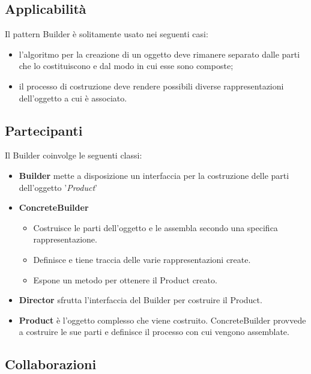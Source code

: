 \subsection{Applicabilità}

Il pattern Builder è solitamente usato nei seguenti casi:
\begin{itemize}
\item l'algoritmo per la creazione di un oggetto deve rimanere separato dalle parti che lo costituiscono e dal modo in cui esse sono composte;
\item il processo di costruzione deve rendere possibili diverse rappresentazioni dell'oggetto a cui è associato.
\end{itemize}

\subsection{Partecipanti}

Il Builder coinvolge le seguenti classi:
\begin{itemize}
\item \textbf{Builder} mette a disposizione un interfaccia per la costruzione delle parti dell'oggetto '\textit{Product}'
\item \textbf{ConcreteBuilder} 
	\begin{itemize}
	\item Costruisce le parti dell'oggetto e le assembla secondo una specifica rappresentazione.
	\item Definisce e tiene traccia delle varie rappresentazioni create.
	\item Espone un metodo per ottenere il Product creato.
	\end{itemize}
\item \textbf{Director} sfrutta l'interfaccia del Builder per costruire il Product.
\item \textbf{Product} è l'oggetto complesso che viene costruito. ConcreteBuilder provvede a costruire le sue parti e definisce il processo con cui vengono assemblate. 
\end{itemize}

\subsection{Collaborazioni}

